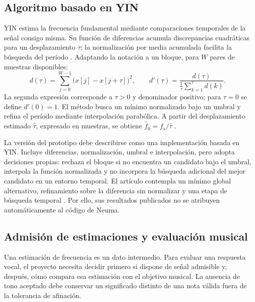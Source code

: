 \subsection{Algoritmo basado en YIN}
\label{sec:estimacion-yin}
YIN estima la frecuencia fundamental mediante comparaciones temporales de la
señal consigo misma. Su función de diferencias acumula discrepancias cuadráticas
para un desplazamiento \(\tau\); la normalización por media acumulada facilita
la búsqueda del período \parencite[pp.~1919--1920]{decheveigne2002yin}.
Adaptando la notación a un bloque, para \(W\) pares de muestras disponibles:
\begin{equation}
  d(\tau)=\sum_{j=0}^{W-1}\bigl(x[j]-x[j+\tau]\bigr)^2,
  \qquad
  d'(\tau)=\frac{d(\tau)}{\frac{1}{\tau}\sum_{k=1}^{\tau}d(k)}.
  \label{eq:yin-diferencias}
\end{equation}
La segunda expresión corresponde a \(\tau>0\) y denominador positivo; para
\(\tau=0\) se define \(d'(0)=1\). El método busca un mínimo normalizado bajo un
umbral y refina el período mediante interpolación parabólica. A partir del
desplazamiento estimado \(\widehat{\tau}\), expresado en muestras, se obtiene
\(\widehat{f}_0=f_s/\widehat{\tau}\)
\parencite[pp.~1920--1921]{decheveigne2002yin}.

La versión del prototipo debe describirse como una implementación basada en YIN.
Incluye diferencias, normalización, umbral e interpolación, pero adopta decisiones
propias: rechaza el bloque si no encuentra un candidato bajo el umbral, interpola
la función normalizada y no incorpora la búsqueda adicional del mejor candidato
en un entorno temporal. El artículo contempla un mínimo global alternativo,
refinamiento sobre la diferencia sin normalizar y una etapa de búsqueda temporal
\parencite[pp.~1920--1921]{decheveigne2002yin}. Por ello, sus resultados publicados
no se atribuyen automáticamente al código de Neuma.


\subsection{Admisión de estimaciones y evaluación musical}
\label{sec:admisibilidad-tono}
Una estimación de frecuencia es un dato intermedio. Para evaluar una respuesta
vocal, el proyecto necesita decidir primero si dispone de señal admisible y,
después, cómo compara esa estimación con el objetivo musical. La ausencia de tono
aceptado debe conservar un significado distinto de una nota válida fuera de la
tolerancia de afinación.


